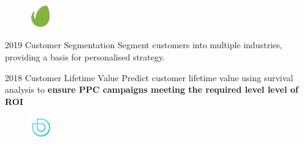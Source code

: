 \documentclass{tccv}
\begin{document}

  


\begin{figure}[h!] %
  \centering
  \includegraphics[width=1cm,height=1cm]{../company_icon/envato.png}
\end{figure}

\begin{yearlist}


  
\item{2019} {Customer Segmentation} {Segment customers into multiple
  industries, providing a basis for personalised strategy.}

\item{2018} {Customer Lifetime Value} {Predict customer lifetime value using
  survival analysis to \textbf{ensure PPC campaigns meeting the required level
    level of ROI}}

\end{yearlist}


\begin{figure}[h!] %
  \centering
  \includegraphics[width=1cm,height=1cm]{../company_icon/deepblu.jpg}
\end{figure}
\end{document}
